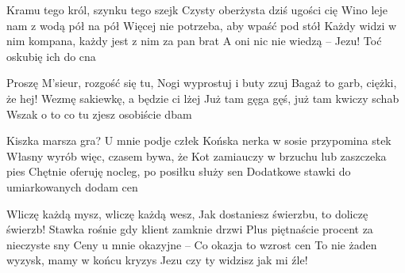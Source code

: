 \documentclass[../../../songbook.tex]{subfiles}
\begin{document}
{\-\hspace{1cm} Kramu tego król, szynku tego szejk							 \newline
\-\hspace{1cm} Czysty oberżysta dziś ugości cię							 \newline
\-\hspace{1cm} Wino leje nam z wodą pół na pół								 \newline
\-\hspace{1cm} Więcej nie potrzeba, aby wpaść pod stół						 \newline
\-\hspace{1cm} Każdy widzi w nim kompana, każdy jest z nim za pan brat		 \newline
\-\hspace{1cm} A oni nic nie wiedzą – Jezu! Toć oskubię ich do cna			 \newline

Proszę M’sieur, rozgość się tu,				 \newline	
Nogi wyprostuj i buty zzuj				 \newline
Bagaż to garb, ciężki, że hej!				 \newline	
Wezmę sakiewkę, a będzie ci lżej				 \newline
Już tam gęga gęś, już tam kwiczy schab				 \newline
Wszak o to co tu zjesz osobiście dbam				 \newline

Kiszka marsza gra? U mnie podje człek				 \newline		
Końska nerka w sosie przypomina stek				 \newline		
Własny wyrób więc, czasem bywa, że				 \newline		
Kot zamiauczy w brzuchu lub zaszczeka pies				 \newline	
Chętnie oferuję nocleg, po posiłku służy sen				 \newline	
Dodatkowe stawki do umiarkowanych dodam cen				 \newline

Wliczę każdą mysz, wliczę każdą wesz,				 \newline		
Jak dostaniesz świerzbu, to doliczę świerzb!			 \newline		
Stawka rośnie gdy klient zamknie drzwi				 \newline		
Plus piętnaście procent za nieczyste sny				 \newline		
Ceny u mnie okazyjne – Co okazja to wzrost cen				 \newline	
To nie żaden wyzysk, mamy w końcu kryzys				 \newline	
Jezu czy ty widzisz jak mi źle!					 \newline		

}
\end{document}

